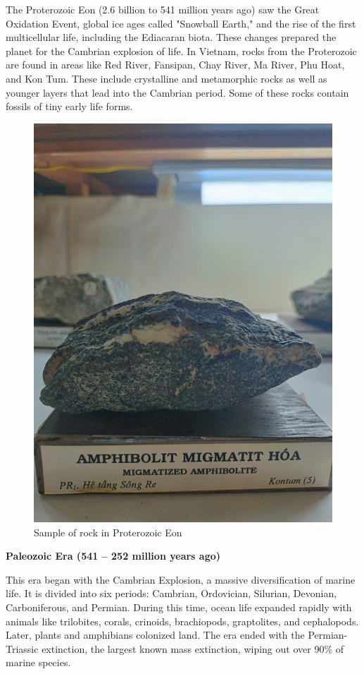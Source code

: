 The Proterozoic Eon (2.6 billion to 541 million years ago) saw the Great Oxidation Event, global ice ages called "Snowball Earth," and the rise of the first multicellular life, including the Ediacaran biota. These changes prepared the planet for the Cambrian explosion of life. In Vietnam, rocks from the Proterozoic are found in areas like Red River, Fansipan, Chay River, Ma River, Phu Hoat, and Kon Tum. These include crystalline and metamorphic rocks as well as younger layers that lead into the Cambrian period. Some of these rocks contain fossils of tiny early life forms.

\begin{figure}[H]
  \centering
  \includegraphics[max width=0.8\linewidth]{graphics/figure_03.jpg}
  \caption{Sample of rock in Proterozoic Eon}
  \label{fig:proterozoic-rock}
\end{figure}

\textbf{Paleozoic Era (541 – 252 million years ago)}

This era began with the Cambrian Explosion, a massive diversification of marine life. It is divided into six periods: Cambrian, Ordovician, Silurian, Devonian, Carboniferous, and Permian. During this time, ocean life expanded rapidly with animals like trilobites, corals, crinoids, brachiopods, graptolites, and cephalopods. Later, plants and amphibians colonized land. The era ended with the Permian-Triassic extinction, the largest known mass extinction, wiping out over 90\% of marine species.

